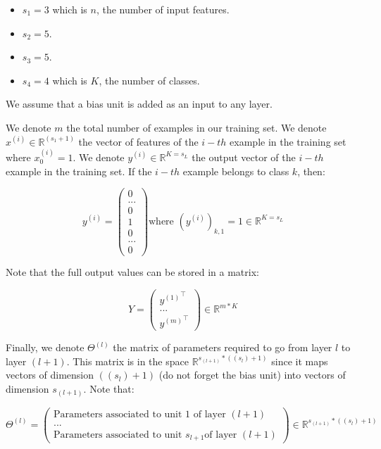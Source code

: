 \documentclass[a4paper, 12pt]{article}
\begin{document}
\begin{itemize}
\item $s_{1} = 3$ which is $n$, the number of input features.
\item $s_{2} = 5$.
\item $s_{3} = 5$.
\item $s_{4} = 4$ which is $K$, the number of classes.
\end{itemize}

We assume that a bias unit is added as an input to any layer.

We denote $m$ the total number of examples in our training set. We denote $x^{(i)} \in \mathbb{R}^{\left(s_{1} + 1 \right)}$ the vector of features of the $i-th$ example in the training set where $x_0^{(i)} = 1$. We denote $y^{(i)} \in \mathbb{R}^{K=s_{L}}$ the output vector of the $i-th$ example in the training set. If the $i-th$ example belongs to class $k$, then:

\begin{equation}
y^{(i)} = \begin{pmatrix} 0 \\ ... \\ 0 \\ 1 \\0 \\ ... \\ 0 \end{pmatrix} \text{where } {\left(y^{(i)} \right)}_{k, 1} = 1 \in \mathbb{R}^{K=s_{L}} 
\end{equation}

Note that the full output values can be stored in a matrix:

\begin{equation}
Y =  \begin{pmatrix} {y^{(1)}}^{\top} \\ ... \\ {y^{(m)}}^{\top} \end{pmatrix} \in \mathbb{R}^{m*K}
\end{equation}


Finally, we denote $\Theta^{(l)}$ the matrix of parameters required to go from layer $l$ to layer $(l+1)$. This matrix is in the space $\mathbb{R}^{s_{(l+1)} * \left((s_{l}) + 1\right)}$ since it maps vectors of dimension $((s_{l}) + 1)$ (do not forget the bias unit) into vectors of dimension $s_{(l+1)}$. Note that:

\begin{equation}
 \Theta^{(l)} =  \begin{pmatrix}  \text{Parameters associated to unit 1 of layer } (l+1) \\ ... \\ \text{Parameters associated to unit } s_{l+1} \text{of layer } (l+1) \end{pmatrix} \in \mathbb{R}^{s_{(l+1)} * \left((s_{l}) + 1\right)}
\end{equation}
\end{document}
